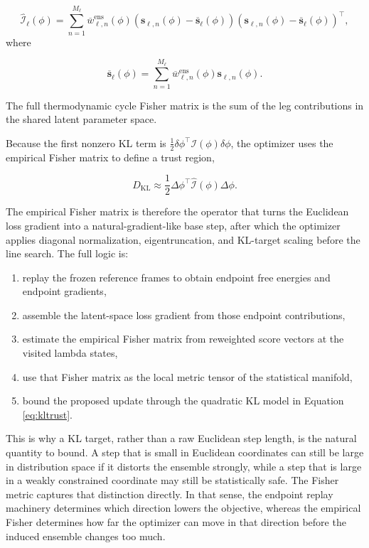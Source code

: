 \begin{equation}
    \widehat{\mathcal{I}}_\ell(\phi)
    =
    \sum_{n=1}^{M_\ell}
    \overline{w}^{\mathrm{ens}}_{\ell,n}(\phi)
    \left(
        \mathbf{s}_{\ell,n}(\phi)
        -
        \overline{\mathbf{s}}_\ell(\phi)
    \right)
    \left(
        \mathbf{s}_{\ell,n}(\phi)
        -
        \overline{\mathbf{s}}_\ell(\phi)
    \right)^\top,
    \label{eq:fimemp}
\end{equation}
%
where

\begin{equation}
    \overline{\mathbf{s}}_\ell(\phi)
    =
    \sum_{n=1}^{M_\ell}
    \overline{w}^{\mathrm{ens}}_{\ell,n}(\phi)
    \mathbf{s}_{\ell,n}(\phi).
    \label{eq:meanemp}
\end{equation}

The full thermodynamic cycle Fisher matrix is the sum of the leg contributions in the shared latent parameter space.

Because the first nonzero KL term is $\frac{1}{2} \delta \phi^\top \mathcal{I}(\phi) \delta \phi$, the optimizer uses the empirical Fisher matrix to define a trust region,

\begin{equation}
    D_{\mathrm{KL}}
    \approx
    \frac{1}{2}
    \Delta \phi^\top
    \widehat{\mathcal{I}}(\phi)
    \Delta \phi.
    \label{eq:kltrust}
\end{equation}

The empirical Fisher matrix is therefore the operator that turns the Euclidean loss gradient into a natural-gradient-like base step, after which the optimizer applies diagonal normalization, eigentruncation, and KL-target scaling before the line search. The full logic is:

\begin{enumerate}
    \item replay the frozen reference frames to obtain endpoint free energies and endpoint gradients,
    \item assemble the latent-space loss gradient from those endpoint contributions,
    \item estimate the empirical Fisher matrix from reweighted score vectors at the visited lambda states,
    \item use that Fisher matrix as the local metric tensor of the statistical manifold,
    \item bound the proposed update through the quadratic KL model in Equation \eqref{eq:kltrust}.
\end{enumerate}
%
This is why a KL target, rather than a raw Euclidean step length, is the natural quantity to bound. A step that is small in Euclidean coordinates can still be large in distribution space if it distorts the ensemble strongly, while a step that is large in a weakly constrained coordinate may still be statistically safe. The Fisher metric captures that distinction directly. In that sense, the endpoint replay machinery determines which direction lowers the objective, whereas the empirical Fisher determines how far the optimizer can move in that direction before the induced ensemble changes too much.
